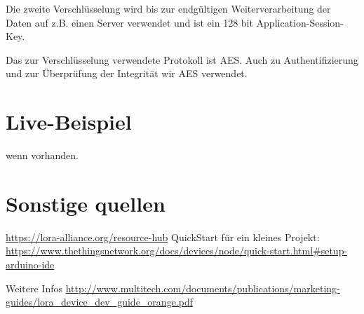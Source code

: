 \documentclass[a4paper,12pt]{article}
\begin{document}
    Die zweite Verschlüsselung wird bis zur endgültigen Weiterverarbeitung der Daten auf z.B. einen Server verwendet und ist ein 128 bit Application-Session-Key.

    Das zur Verschlüsselung verwendete Protokoll ist AES. Auch zu Authentifizierung und zur Überprüfung der Integrität wir AES verwendet.
    \cite{LoRaSecur}
        \cite{RFC8376}
        \cite{WhatIsLoRa}

    \section{Live-Beispiel}
    wenn vorhanden.
    \section{Sonstige quellen}
    \url{https://lora-alliance.org/resource-hub}
    QuickStart für ein kleines Projekt: \url{https://www.thethingsnetwork.org/docs/devices/node/quick-start.html#setup-arduino-ide}

    Weitere Infos \url{http://www.multitech.com/documents/publications/marketing-guides/lora_device_dev_guide_orange.pdf}
    \newpage
    
    
\end{document}
